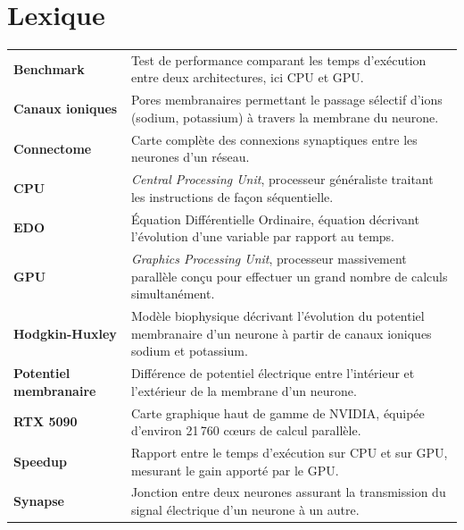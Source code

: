 \documentclass{report}
\title{\DocName}
\author{\DocAuthors}
\date{\textbf{JUNIA - ISEN - AP4} \url{https://github.com/CharlesBta/Modele-Neuronaux-RD.git}}
\begin{document}
\maketitle

\chapter*{Lexique}

\begin{tabular}{@{}p{4cm}p{11cm}@{}}
    \textbf{Benchmark} & Test de performance comparant les temps d'exécution entre deux architectures, ici CPU et GPU. \\[6pt]
    \textbf{Canaux ioniques} & Pores membranaires permettant le passage sélectif d'ions (sodium, potassium) à travers la membrane du neurone. \\[6pt]
    \textbf{Connectome} & Carte complète des connexions synaptiques entre les neurones d'un réseau. \\[6pt]
    \textbf{CPU} & \textit{Central Processing Unit}, processeur généraliste traitant les instructions de façon séquentielle. \\[6pt]
    \textbf{EDO} & Équation Différentielle Ordinaire, équation décrivant l'évolution d'une variable par rapport au temps. \\[6pt]
    \textbf{GPU} & \textit{Graphics Processing Unit}, processeur massivement parallèle conçu pour effectuer un grand nombre de calculs simultanément. \\[6pt]
    \textbf{Hodgkin-Huxley} & Modèle biophysique décrivant l'évolution du potentiel membranaire d'un neurone à partir de canaux ioniques sodium et potassium. \\[6pt]
    \textbf{Potentiel membranaire} & Différence de potentiel électrique entre l'intérieur et l'extérieur de la membrane d'un neurone. \\[6pt]
    \textbf{RTX 5090} & Carte graphique haut de gamme de NVIDIA, équipée d'environ 21\,760 cœurs de calcul parallèle. \\[6pt]
    \textbf{Speedup} & Rapport entre le temps d'exécution sur CPU et sur GPU, mesurant le gain apporté par le GPU. \\[6pt]
    \textbf{Synapse} & Jonction entre deux neurones assurant la transmission du signal électrique d'un neurone à un autre. \\[6pt]
\end{tabular}

\tableofcontents
\end{document}
